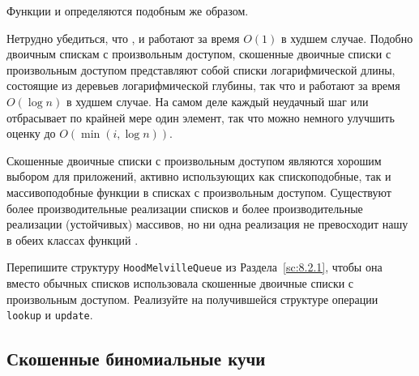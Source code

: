 \begin{frame}[fragile]{}

Функции  и 
определяются подобным же образом. 
%
%
%

\end{frame}

\begin{frame}[fragile]{}

Нетрудно убедиться, что ,  и
 работают за время $O(1)$ в худшем случае. Подобно
двоичным спискам с произвольным доступом, скошенные двоичные списки с
произвольным доступом представляют собой списки логарифмической длины,
состоящие из деревьев логарифмической глубины, так что
 и  работают за время $O(\log n)$
в худшем случае. На самом деле каждый неудачный шаг 
или  отбрасывает по крайней мере один элемент, так
что можно немного улучшить оценку до $O(\min(i, \log n))$.

\begin{hint}
  Скошенные двоичные списки с произвольным доступом являются хорошим
  выбором для приложений, активно использующих как спископодобные, так
  и массивоподобные функции в списках с произвольным
  доступом. Существуют более производительные реализации списков и
  более производительные реализации (устойчивых) массивов, но ни одна
  реализация не превосходит нашу в обеих классах функций \cite{Okasaki1995b}.
\end{hint}
\end{frame}

\ifanswers
\begin{frame}[fragile]{}
\begin{exercise}\label{ex:9.14}
  Перепишите структуру \lstinline!HoodMelvilleQueue! из
  Раздела~\ref{sc:8.2.1}, чтобы она вместо обычных списков
  использовала скошенные двоичные списки с произвольным
  доступом. Реализуйте на получившейся структуре операции
  \lstinline!lookup! и \lstinline!update!.
\end{exercise}
\end{frame}
\fi 

\subsection{Скошенные биномиальные кучи}
\label{sc:9.3.2}

